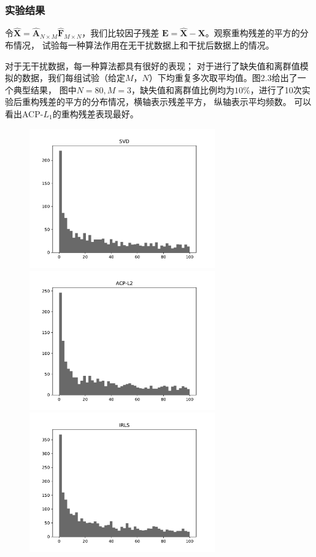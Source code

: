 \subsubsection{实验结果}
令$\hat{\bm{X}} = \hat{\bm{A}}_{N \times M}\hat{\bm{F}}_{M \times N}$，我们比较因子残差
$\bm{E} = \hat{\bm{X}} -\bm{X}$。观察重构残差的平方的分布情况，
试验每一种算法作用在无干扰数据上和干扰后数据上的情况。

对于无干扰数据，每一种算法都具有很好的表现；
对于进行了缺失值和离群值模拟的数据，我们每组试验（给定$M$，$ N$）下均重复多次取平均值。图2.3给出了一个典型结果，
图中$N = 80, M=3$，缺失值和离群值比例均为$10\%$，进行了10次实验后重构残差的平方的分布情况，横轴表示残差平方，
纵轴表示平均频数。
可以看出ACP-$L_1$的重构残差表现最好。
\begin{figure}[H]
    \centering
    \begin{minipage}[t]{0.48\textwidth}
    \includegraphics[width=8cm]{pics/lab1/svd.pdf}
    \end{minipage}
    \begin{minipage}[t]{0.48\textwidth}
    \includegraphics[width=8cm]{pics/lab1/acp-l2.pdf}
    \end{minipage}
    \begin{minipage}[t]{0.48\textwidth}
    \includegraphics[width=8cm]{pics/lab1/IRLS.pdf}

\end{minipage}
\end{figure}

